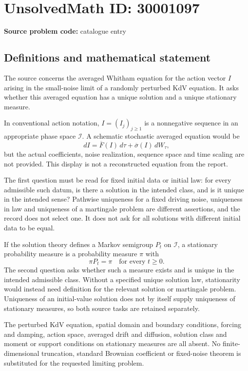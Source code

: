 \documentclass[11pt]{article}
\begin{document}
\section*{UnsolvedMath ID: 30001097}
\textbf{Source problem code:} catalogue entry
\subsection{Definitions and mathematical statement}
The source concerns the averaged Whitham equation for the action vector $I$ arising in the small-noise limit of a randomly perturbed KdV equation. It asks whether this averaged equation has a unique solution and a unique stationary measure.

In conventional action notation, $I=(I_j)_{j\geq1}$ is a nonnegative sequence in an appropriate phase space $\mathcal I$. A schematic stochastic averaged equation would be
\[
dI=\overline F(I)\,d\tau+\overline\sigma(I)\,dW_\tau,
\]
but the actual coefficients, noise realization, sequence space and time scaling are not provided. This display is not a reconstructed equation from the report.

The first question must be read for fixed initial data or initial law: for every admissible such datum, is there a solution in the intended class, and is it unique in the intended sense? Pathwise uniqueness for a fixed driving noise, uniqueness in law and uniqueness of a martingale problem are different assertions, and the record does not select one. It does not ask for all solutions with different initial data to be equal.

If the solution theory defines a Markov semigroup $P_t$ on $\mathcal I$, a stationary probability measure is a probability measure $\pi$ with
\[
\pi P_t=\pi\quad\text{for every }t\geq0.
\]
The second question asks whether such a measure exists and is unique in the intended admissible class. Without a specified unique solution law, stationarity would instead need definition for the relevant solution or martingale problem. Uniqueness of an initial-value solution does not by itself supply uniqueness of stationary measures, so both source tasks are retained separately.

The perturbed KdV equation, spatial domain and boundary conditions, forcing and damping, action space, averaged drift and diffusion, solution class and moment or support conditions on stationary measures are all absent. No finite-dimensional truncation, standard Brownian coefficient or fixed-noise theorem is substituted for the requested limiting problem.
\end{document}

